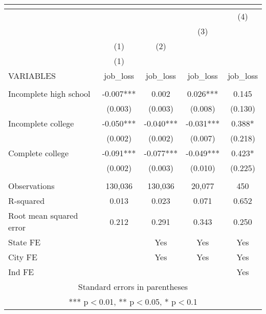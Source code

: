 \begin{tabular}{lcccc}
\multicolumn{5}{c}{} \\ \hline
 &  &  &  & (4) \\
 &  &  & (3) &  \\
 & (1) & (2) &  &  \\
 & (1) &  &  &  \\
VARIABLES & job\_loss & job\_loss & job\_loss & job\_loss \\ \hline
 &  &  &  &  \\
Incomplete high school & -0.007*** & 0.002 & 0.026*** & 0.145 \\
 & (0.003) & (0.003) & (0.008) & (0.130) \\
Incomplete college & -0.050*** & -0.040*** & -0.031*** & 0.388* \\
 & (0.002) & (0.002) & (0.007) & (0.218) \\
Complete college & -0.091*** & -0.077*** & -0.049*** & 0.423* \\
 & (0.002) & (0.003) & (0.010) & (0.225) \\
 &  &  &  &  \\
Observations & 130,036 & 130,036 & 20,077 & 450 \\
R-squared & 0.013 & 0.023 & 0.071 & 0.652 \\
Root mean squared error & 0.212 & 0.291 & 0.343 & 0.250 \\
State FE &  & Yes & Yes & Yes \\
City FE &  & Yes & Yes & Yes \\
 Ind FE &  &  &  & Yes \\ \hline
\multicolumn{5}{c}{ Standard errors in parentheses} \\
\multicolumn{5}{c}{ *** p$<$0.01, ** p$<$0.05, * p$<$0.1} \\
\end{tabular}
